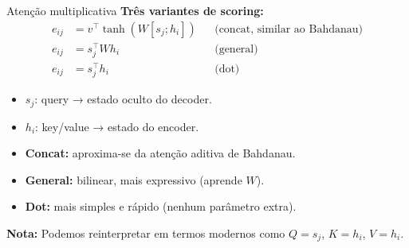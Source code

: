 \documentclass{beamer}
\begin{document}
\begin{frame}{Atenção multiplicativa \cite{luong2015effective}}
\textbf{Três variantes de scoring:}
\[
\begin{aligned}
e_{ij} &= v^\top \tanh(W [s_j; h_i]) && \text{(concat, similar ao Bahdanau)} \\
e_{ij} &= s_j^\top W h_i && \text{(general)} \\
e_{ij} &= s_j^\top h_i && \text{(dot)}
\end{aligned}
\]

\begin{itemize}
  \item $s_j$: query → estado oculto do decoder.
  \item $h_i$: key/value → estado do encoder.
  \item \textbf{Concat:} aproxima-se da atenção aditiva de Bahdanau.
  \item \textbf{General:} bilinear, mais expressivo (aprende $W$).
  \item \textbf{Dot:} mais simples e rápido (nenhum parâmetro extra).
\end{itemize}

\textbf{Nota:} Podemos reinterpretar em termos modernos como $Q=s_j$, $K=h_i$, $V=h_i$.
\end{frame}
\end{document}
